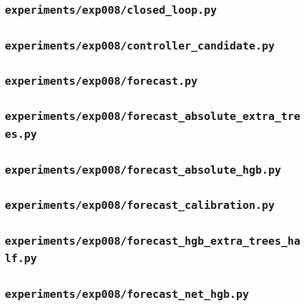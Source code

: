 \subsection*{\nolinkurl{experiments/exp008/closed_loop.py}}


\subsection*{\nolinkurl{experiments/exp008/controller_candidate.py}}


\subsection*{\nolinkurl{experiments/exp008/forecast.py}}


\subsection*{\nolinkurl{experiments/exp008/forecast_absolute_extra_trees.py}}


\subsection*{\nolinkurl{experiments/exp008/forecast_absolute_hgb.py}}


\subsection*{\nolinkurl{experiments/exp008/forecast_calibration.py}}


\subsection*{\nolinkurl{experiments/exp008/forecast_hgb_extra_trees_half.py}}


\subsection*{\nolinkurl{experiments/exp008/forecast_net_hgb.py}}


